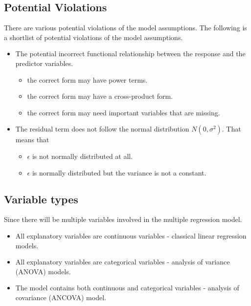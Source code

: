 \documentclass[
]{book}
\providecommand{\tightlist}{%
  \setlength{\itemsep}{0pt}\setlength{\parskip}{0pt}}
\begin{document}
\hypertarget{potential-violations}{%
\subsection{Potential Violations}\label{potential-violations}}

There are various potential violations of the model assumptions. The following is a shortlist of potential violations of the model assumptions.

\begin{itemize}
\tightlist
\item
  The potential incorrect functional relationship between the response and the predictor variables.

  \begin{itemize}
  \tightlist
  \item
    the correct form may have power terms.
  \item
    the correct form may have a cross-product form.
  \item
    the correct form may need important variables that are missing.
  \end{itemize}
\item
  The residual term does not follow the normal distribution \(N(0, \sigma^2)\). That means that

  \begin{itemize}
  \tightlist
  \item
    \(\epsilon\) is not normally distributed at all.
  \item
    \(\epsilon\) is normally distributed but the variance is not a constant.
  \end{itemize}
\end{itemize}

\hypertarget{variable-types}{%
\subsection{Variable types}\label{variable-types}}

Since there will be multiple variables involved in the multiple regression model.

\begin{itemize}
\item
  All explanatory variables are continuous variables - classical linear regression models.
\item
  All explanatory variables are categorical variables - analysis of variance (ANOVA) models.
\item
  The model contains both continuous and categorical variables - analysis of covariance (ANCOVA) model.
\end{itemize}
\end{document}
